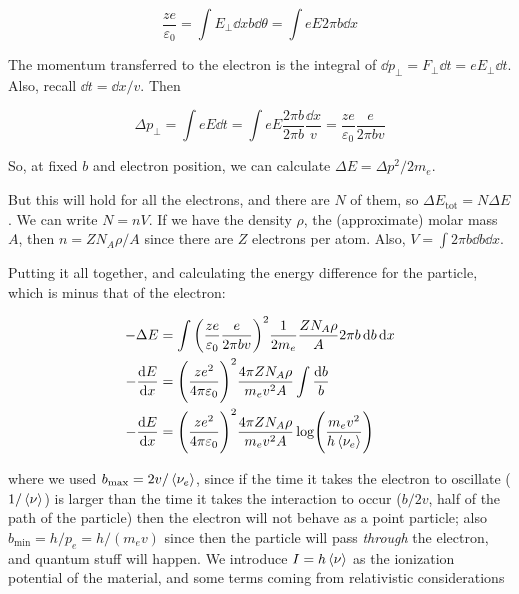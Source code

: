 \documentclass{article}
\begin{document}
\begin{equation}
    \frac{ze}{\varepsilon_0} = \int E_\perp  \dd{x} b\dd{\theta} = \int eE 2 \pi b  \dd{x}
\end{equation}

The momentum transferred to the electron is the integral of \(\dd{p}_\perp = F_\perp \dd{t}  = eE_\perp \dd{t} \). Also, recall \(\dd{t} = \dd{x} /v \). Then

\begin{equation}
    \Delta p _\perp = \int  eE \dd{t}
    = \int eE \frac{2 \pi b}{2 \pi b} \frac{\dd{x}}{v}
    = \frac{ze}{\varepsilon_0} \frac{e}{2 \pi b v}
\end{equation}

So, at fixed \(b\) and electron position, we can calculate \(\Delta E = \Delta p ^2 / 2 m_e\).

But this will hold for all the electrons, and there are \(N\) of them, so \(\Delta E _ \text{tot} = N \Delta E\). We can write \(N = n V\). If we have the density \(\rho\), the (approximate) molar mass \(A\), then \(n =Z N_A \rho/A\) since there are \(Z\) electrons per atom.
Also, \(V = \int 2 \pi b \dd{b} \dd{x}\).

Putting it all together, and calculating the energy difference for the particle, which is minus that of the electron:

\begin{subequations}
\begin{align}
    -\Delta E &= \int  \qty(\frac{ze}{\varepsilon_0} \frac{e}{2 \pi b v})^2 \frac{1}{2 m_e} \frac{ZN_A \rho}{A} 2 \pi b \dd{b} \dd{x} \\
    - \dv{E}{x} &= \qty(\frac{ze^2}{4 \pi \varepsilon_0})^2 \frac{4 \pi Z N_A \rho}{m_e v^2 A} \int \frac{\dd{b}}{b} \\
    - \dv{E}{x} &= \qty(\frac{ze^2}{4 \pi \varepsilon_0})^2 \frac{4 \pi Z N_A \rho}{m_e v^2 A}  \log(\frac{m_e v^2}{h \expval{\nu_e}})
\end{align}
\end{subequations}

where we used \(b_ \text{max} = 2v / \expval{\nu_e} \), since if the time it takes the electron to oscillate (\(1/\expval{\nu} \)) is larger than the time it takes the interaction to occur  (\(b/2v\), half of the path of the particle) then the electron will not behave as a point particle;
also \(b_\text{min} = h / p_e = h/(m_ev)\) since then the particle will pass \emph{through} the electron, and quantum stuff will happen.
We introduce \(I = h \expval{\nu} \) as the ionization potential of the material, and some terms coming from  relativistic considerations
\end{document}
